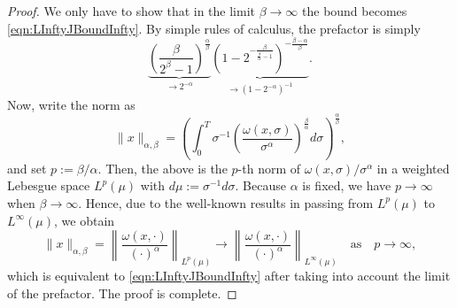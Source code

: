\documentclass[12pt,a4paper]{article}
\begin{document}
\begin{proof}
	We only have to show that in the limit $\beta\rightarrow\infty$ the bound becomes \eqref{eqn:LInftyJBoundInfty}. By simple rules of calculus, the prefactor is simply
	\begin{equation}
		\underbrace{\left(\frac{\beta}{2^{\beta}-1}\right)^\frac{\alpha}{\beta}}_{\rightarrow 2^{-\alpha}} \underbrace{\left(1-2^{-\frac{\beta}{\frac{\beta}{\alpha}-1}}\right)^{-\frac{\beta - \alpha}{\beta}}}_{\rightarrow (1-2^{-\alpha})^{-1}}.
	\end{equation}
	Now, write the norm as
	\begin{equation}
		\|x\|_{\alpha,\beta} = \left(\int_0^T \sigma^{-1} \left(\frac{\omega(x,\sigma)}{\sigma^\alpha}\right)^\frac{\beta}{\alpha}d\sigma\right)^\frac{\alpha}{\beta},
	\end{equation}
	and set $p:= \beta/\alpha$. Then, the above is the $p$-th norm of $\omega(x,\sigma)/\sigma^{\alpha}$ in a weighted Lebesgue space $L^p(\mu)$ with $d\mu := \sigma^{-1} d\sigma$. Because $\alpha$ is fixed, we have $p\rightarrow\infty$ when $\beta\rightarrow\infty$. Hence, due to the well-known results in passing from $L^p(\mu)$ to $L^\infty(\mu)$, we obtain
	\begin{equation}
		\|x\|_{\alpha,\beta} = \left\|\frac{\omega(x, \cdot)}{(\cdot)^\alpha}\right\|_{L^p(\mu)} \longrightarrow \left\|\frac{\omega(x, \cdot)}{(\cdot)^\alpha}\right\|_{L^\infty(\mu)} \quad \text{as} \quad p \longrightarrow \infty,
	\end{equation}
	which is equivalent to \eqref{eqn:LInftyJBoundInfty} after taking into account the limit of the prefactor. The proof is complete. 
\end{proof}
\end{document}
